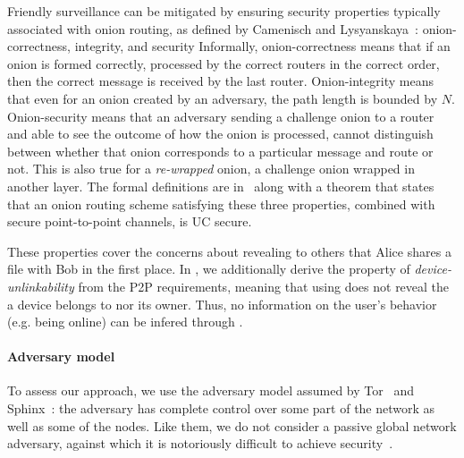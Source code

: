 Friendly surveillance can be mitigated by ensuring security properties 
typically associated with onion routing, as defined by Camenisch and Lysyanskaya~\cite{CLOnionRouting}: 
onion-correctness, integrity, and security %
Informally, onion-correctness means that if an onion is formed
correctly, processed by the correct routers in the correct order, then
the correct message is received by the last router. Onion-integrity
means that even for an onion created by an adversary, the path length
is bounded by $N$. Onion-security means that an adversary sending a
challenge onion to a router and able to see the outcome of how the
onion is processed, cannot distinguish between whether that onion
corresponds to a particular message and route or not. This is also
true for a \emph{re-wrapped} onion, \ie a challenge onion wrapped in
another layer. The formal definitions are in~\cite{CLOnionRouting} along
with a theorem that states that an onion routing scheme satisfying
these three properties, combined with secure point-to-point channels,
is UC secure.

These properties cover the concerns about
revealing to others that Alice shares a file with Bob in the first
place. In \name, we additionally derive the property of
\emph{device-unlinkability} from the \ac{P2P} requirements, meaning that
using \name does not reveal the \squad a device belongs to nor its
owner. Thus, no information on the user's behavior (e.g. being online)
can be infered through \name. 



\paragraph*{Adversary model} To assess our approach, we use the
adversary model assumed by Tor~\cite{Tor} and Sphinx~\cite{Sphinx}:
the adversary has complete control over some part of the network as
well as some of the nodes. Like them, we do not consider a passive global network
adversary, against which it is notoriously difficult to achieve
security~\cite{SystemsForAnonymousCommunication}.
